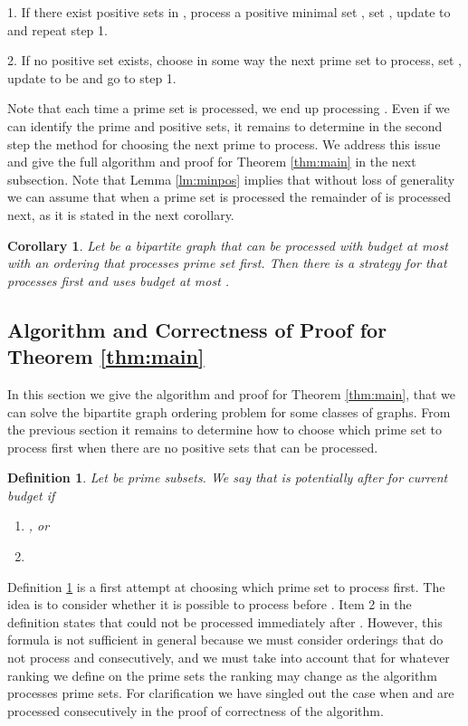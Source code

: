 \documentclass[letterpaper,11pt,abstracton]{scrartcl}
\newtheorem{cor}[theorem]{Corollary}
\newtheorem{dfn}[theorem]{Definition}
\begin{document}
1. If there exist positive sets in , process a positive minimal
set , set , update  to   and repeat step 1.

2. If no positive set exists, choose in some way the next prime
set  to process, set , update  to be  and go to step 1.

Note that each time a prime set  is processed, we end up processing
.  Even if we can identify the prime and positive sets, it
remains to determine in the second step the method for choosing the next
prime to process.  We address this issue and give the full algorithm and
proof for Theorem \ref{thm:main} in the next subsection.  Note that Lemma
\ref{lm:minpos} implies that without loss of generality we can assume that
when a prime set  is processed the remainder of  is processed
next, as it is stated in the next corollary.

\begin{cor}
  Let  be a bipartite graph that can be processed with budget
  at most  with an ordering that processes prime set  first. Then
  there is a strategy for  that processes  first and uses budget
  at most .
\end{cor}


\subsection{Algorithm and Correctness of Proof for Theorem \ref{thm:main}}\label{sec:main-pf}

In this section we give the algorithm and proof for Theorem \ref{thm:main}, that
we can solve the bipartite graph ordering problem for some classes of graphs. From the previous section it remains to determine how to choose
which prime set to process first when there are no positive sets that can be
processed.

\begin{dfn} \label{dfn:pre-order}
Let  be prime subsets. We say that  is {\em potentially after}  for current budget  if

\begin{enumerate}

 \item , or
\item
  
\end{enumerate}
\end{dfn}



Definition \ref{dfn:pre-order} is a first attempt at choosing which
prime set to process first. The idea is to consider whether it is
possible to process  before .  Item 2 in the definition states
that  could not be processed immediately after .  However, this
formula is not sufficient in general because we must consider
orderings that do not process  and  consecutively, and we must
take into account that for whatever ranking we define on the prime
sets the ranking may change as the algorithm processes prime sets.
For clarification we have singled out the case when  and  are
processed consecutively in the proof of correctness of the algorithm.
\end{document}
